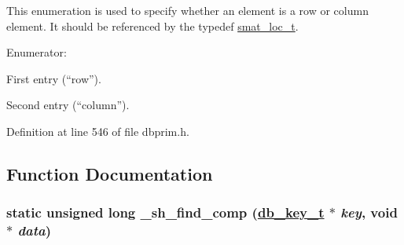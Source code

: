 This enumeration is used to specify whether an element is a row or column element. It should be referenced by the typedef \hyperlink{group__dbprim__smat_ga6}{smat\_\-loc\_\-t}.\begin{Desc}
\item[Enumerator: ]\par
\begin{description}
\item[{\em 
\hypertarget{group__dbprim__smat_gga70a137}{
SMAT\_\-LOC\_\-FIRST}
\label{group__dbprim__smat_gga70a137}
}]First entry (``row''). \item[{\em 
\hypertarget{group__dbprim__smat_gga70a138}{
SMAT\_\-LOC\_\-SECOND}
\label{group__dbprim__smat_gga70a138}
}]Second entry (``column''). \end{description}
\end{Desc}



Definition at line 546 of file dbprim.h.

\subsection{Function Documentation}
\hypertarget{group__dbprim__smat_ga27}{
\subsubsection[\_\-sh\_\-find\_\-comp]{\setlength{\rightskip}{0pt plus 5cm}static unsigned long \_\-sh\_\-find\_\-comp (\hyperlink{struct__db__key__s}{db\_\-key\_\-t} $\ast$ {\em key}, void $\ast$ {\em data})}}
\label{group__dbprim__smat_ga27}


